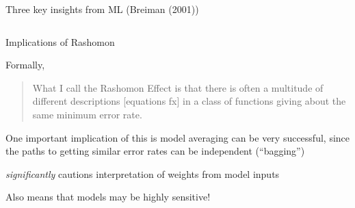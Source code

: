 \documentclass[notes,11pt, aspectratio=169]{beamer}
\newenvironment{wideitemize}{\itemize\addtolength{\itemsep}{10pt}}{\enditemize}
\begin{document}
\begin{frame}{Three key insights from ML (Breiman (2001))}
\begin{columns}[onlytextwidth, T]
\begin{column}{.4\textwidth}
      \end{column}%
    \end{columns}
\end{frame}

\begin{frame}{Implications of Rashomon}
  \begin{wideitemize}
  \item Formally,
    \begin{quote} What I call the Rashomon Effect is
      that there is often a multitude of different descriptions
      [equations fx] in a class of functions giving about the same
      minimum error rate.
    \end{quote}
  \item One important implication of this is model averaging can be
    very successful, since the paths to getting similar error rates
    can be independent (``bagging'')
  \item \emph{significantly} cautions interpretation of weights from
    model inputs
  \item Also means that models may be highly sensitive!
  \end{wideitemize}
\end{frame}
\end{document}
